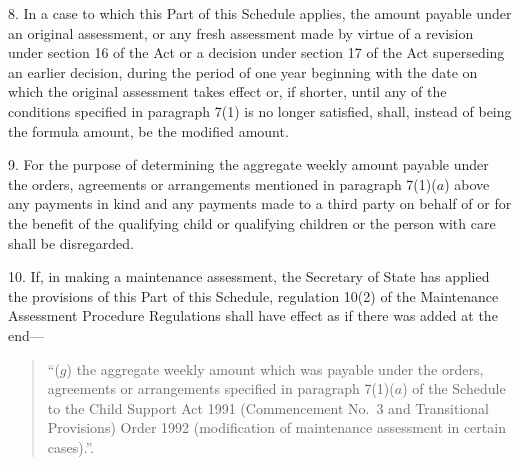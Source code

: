\documentclass[12pt,a4paper]{article}
\begin{document}

\medskip

8.  In a case to which this Part of this Schedule applies, the amount payable under an original assessment, or any fresh assessment made  
by virtue of a revision under section 16 of the Act or a decision under section 17 of the Act superseding an earlier decision,  %
during the period of one year beginning with the date on which the original assessment takes effect or, if shorter, until any of the conditions specified in paragraph 7(1) is no longer satisfied, shall, instead of being the formula amount, be the modified amount.


\medskip

9.  For the purpose of determining the aggregate weekly amount payable under the orders, agreements or arrangements mentioned in paragraph 7(1)($a$) above any payments in kind and any payments made to a third party on behalf of or for the benefit of the qualifying child or qualifying children or the person with care shall be disregarded.

\medskip

10.  If, in making a maintenance assessment, 
the Secretary of State  %
has applied the provisions of this Part of this Schedule, regulation 10(2) of the Maintenance Assessment Procedure Regulations shall have effect as if there was added at the end—
\begin{quotation}
“($g$) the aggregate weekly amount which was payable under the orders, agreements or arrangements specified in paragraph 7(1)($a$) of the Schedule to the Child Support Act 1991 (Commencement No.\ 3 and Transitional Provisions) Order 1992 (modification of maintenance assessment in certain cases).”.
\end{quotation}
\end{document}
